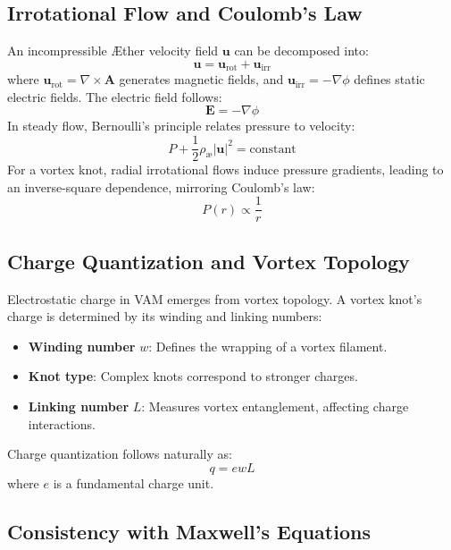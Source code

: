 \documentclass[a4paper,12pt]{article}
\begin{document}
\subsection{Irrotational Flow and Coulomb's Law}


An incompressible Æther velocity field $\mathbf{u}$ can be decomposed into:
\begin{equation}
    \mathbf{u} = \mathbf{u}_{\mathrm{rot}} + \mathbf{u}_{\mathrm{irr}}
\end{equation}
where $\mathbf{u}_{\mathrm{rot}} = \nabla \times \mathbf{A}$ generates magnetic fields, and $\mathbf{u}_{\mathrm{irr}} = -\nabla \phi$ defines static electric fields. The electric field follows:
\begin{equation}
    \mathbf{E} = -\nabla \phi
\end{equation}
In steady flow, Bernoulli's principle relates pressure to velocity:
\begin{equation}
    P + \frac{1}{2}\rho_\text{\ae} |\mathbf{u}|^2 = \text{constant}
\end{equation}
For a vortex knot, radial irrotational flows induce pressure gradients, leading to an inverse-square dependence, mirroring Coulomb's law:
\begin{equation}
    P(r) \propto \frac{1}{r}
\end{equation}


\subsection{Charge Quantization and Vortex Topology}


Electrostatic charge in VAM emerges from vortex topology. A vortex knot's charge is determined by its winding and linking numbers:
\begin{itemize}
    \item \textbf{Winding number} $w$: Defines the wrapping of a vortex filament.
    \item \textbf{Knot type}: Complex knots correspond to stronger charges.
    \item \textbf{Linking number} $L$: Measures vortex entanglement, affecting charge interactions.
\end{itemize}
Charge quantization follows naturally as:
\begin{equation}
    q = e w L
\end{equation}
where $e$ is a fundamental charge unit.


\subsection{Consistency with Maxwell's Equations}
\end{document}
